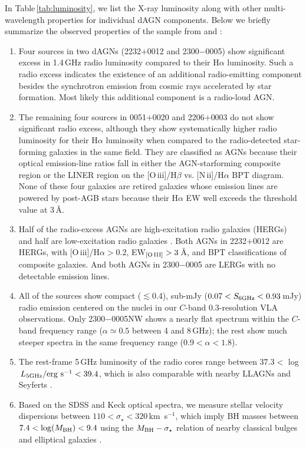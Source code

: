 \documentclass[iop,revtex4,twocolumn,apj,numberedappendix,appendixfloats]{emulateapj}
\newcommand{\kms}{km~s$^{-1}$}
\begin{document}
In Table\,\ref{tab:luminosity}, we list the X-ray luminosity along with other multi-wavelength properties for individual dAGN components. Below we briefly summarize the observed properties of the sample from  and : 

\begin{enumerate}

\item Four sources in two dAGNs (2232$+$0012 and 2300$-$0005) show significant excess in 1.4\,GHz radio luminosity compared to their H$\alpha$ luminosity. Such a radio excess indicates the existence of an additional radio-emitting component besides the synchrotron emission from cosmic rays accelerated by star formation. Most likely this additional component is a radio-loud AGN. 

\item The remaining four sources in 0051$+$0020 and 2206$+$0003 do not show significant radio excess, although they show systematically higher radio luminosity for their H$\alpha$ luminosity when compared to the radio-detected star-forming galaxies in the same field. They are classified as AGNs because their optical emission-line ratios fall in either the AGN-starforming composite region or the LINER region on the [O\,{\sc iii}]/H$\beta$ vs. [N\,{\sc ii}]/H$\alpha$ BPT diagram. None of these four galaxies are retired galaxies whose emission lines are powered by post-AGB stars because their H$\alpha$ EW well exceeds the threshold value at 3\,\AA. 

\item Half of the radio-excess AGNs are high-excitation radio galaxies (HERGs) and half are low-excitation radio galaxies \citep[LERGs;][]{Laing94}. Both AGNs in 2232$+$0012 are HERGs, with [O\,{\sc iii}]/H$\alpha > 0.2$, EW$_{\rm [O\,III]} > 3$\,\AA, and BPT classifications of composite galaxies. And both AGNs in 2300$-$0005 are LERGs with no detectable emission lines. 

\item All of the sources show compact ($\lesssim$0.4\arcsec), sub-mJy ($0.07 < S_{\rm 6GHz} < 0.93$\,mJy) radio emission centered on the nuclei in our $C$-band 0.3\arcsec-resolution VLA observations. Only 2300$-$0005NW shows a nearly flat spectrum within the $C$-band frequency range ($\alpha \simeq 0.5$ between 4 and 8\,GHz); the rest show much steeper spectra in the same frequency range ($0.9 < \alpha < 1.8$).

\item The rest-frame 5\,GHz luminosity of the radio cores range between $37.3 < $ log$\,L_{\rm 5GHz}/{\rm erg~s}^{-1} < 39.4$, which is also comparable with nearby LLAGNs and Seyferts \citep{Ho08,She17}.

\item Based on the SDSS and Keck optical spectra, we measure stellar velocity dispersions between $110 < \sigma_\star < 320$\,\kms, which imply BH masses between $7.4 < \log(M_{\rm BH}) < 9.4$ using the $M_{\rm BH}-\sigma_\star$ relation of nearby classical bulges and elliptical galaxies \citep{Kormendy13}. 

\end{enumerate}
\end{document}
